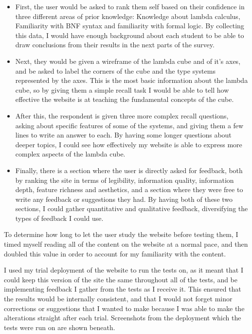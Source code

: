 \documentclass{l4proj}
\begin{document}
\begin{itemize}
    \item First, the user would be asked to rank them self based on their confidence in three different areas of prior knowledge: Knowledge about lambda calculus, Familiarity with BNF syntax and familiarity with formal logic.  By collecting this data, I would have enough background about each student to be able to draw conclusions from their results in the next parts of the survey.

    \item Next, they would be given a wireframe of the lambda cube and of it's axes, and be asked to label the corners of the cube and the type systems represented by the axes.  This is the most basic information about the lambda cube, so by giving them a simple recall task I would be able to tell how effective the website is at teaching the fundamental concepts of the cube.

    \item After this, the respondent is given three more complex recall questions, asking about specific features of some of the systems, and giving them a few lines to write an answer to each.  By having some longer questions about deeper topics, I could see how effectively my website is able to express more complex aspects of the lambda cube.

    \item Finally, there is a section where the user is directly asked for feedback, both by ranking the site in terms of legibility, information quality, information depth, feature richness and aesthetics, and a section where they were free to write any feedback or suggestions they had.  By having both of these two sections, I could gather quantitative and qualitative feedback, diversifying the types of feedback I could use.
\end{itemize}

To determine how long to let the user study the website before testing them, I timed myself reading all of the content on the website at a normal pace, and then doubled this value in order to account for my familiarity with the content.

I used my trial deployment of the website to run the tests on, as it meant that I could keep this version of the site the same throughout all of the tests, and be implementing feedback I gather from the tests as I receive it.  This ensured that the results would be internally consistent, and that I would not forget minor corrections or suggestions that I wanted to make because I was able to make the alterations straight after each trial.  Screenshots from the deployment which the tests were run on are shown beneath.
\end{document}
